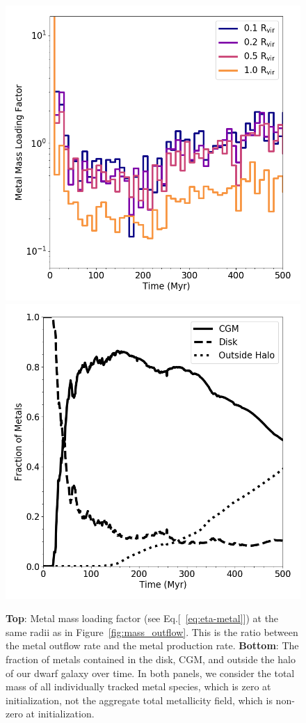 \documentclass[twocolumn]{aastex61}
\begin{document}
\begin{figure}
\centering
\includegraphics[width=0.9\linewidth]{metal_mass_loading} \\
\includegraphics[width=0.9\linewidth]{metal_fraction_evolution}
\caption{{\bf Top}: Metal mass loading factor (see Eq.[~\ref{eq:eta-metal}]) at the same radii as in Figure~\ref{fig:mass_outflow}. This is the ratio between the metal outflow rate and the metal production rate. {\bf Bottom}: The fraction of metals contained in the disk, CGM, and outside the halo of our dwarf galaxy over time. In both panels, we consider the total mass of all individually tracked metal species, which is zero at initialization, not the aggregate total metallicity field, which is non-zero at initialization.}
\label{fig:metal_evolution}
\end{figure}
\end{document}
